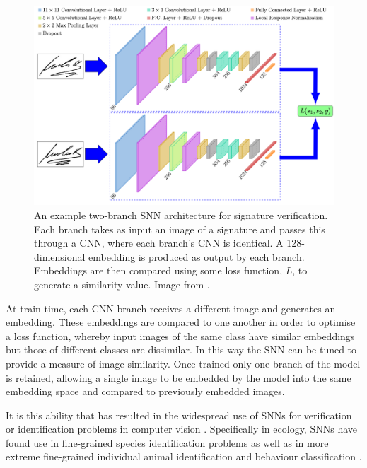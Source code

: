 \begin{figure}
	\begin{center}
		\includegraphics[width=0.8\linewidth]{Chapter6/figs/signet-SNN-architecture.png}
	\end{center}
	\caption[An example two-branch SNN architecture for signature verification.]{An example two-branch SNN architecture for signature verification. Each branch takes as input an image of a signature and passes this through a CNN, where each branch's CNN is identical. A 128-dimensional embedding is produced as output by each branch. Embeddings are then compared using some loss function, $L$, to generate a similarity value. Image from \cite{dey_signet_2017}.}
	\label{fig:signet-SNN-architecture}
\end{figure}

At train time, each CNN branch receives a different image and generates an embedding. These embeddings are compared to one another in order to optimise a loss function, whereby input images of the same class have similar embeddings but those of different classes are dissimilar. In this way the SNN can be tuned to provide a measure of image similarity. Once trained only one branch of the model is retained, allowing a single image to be embedded by the model into the same embedding space and compared to previously embedded images.

It is this ability that has resulted in the widespread use of SNNs for verification or identification problems in computer vision \cite{dey_signet_2017, wang_discriminative_2020}. Specifically in ecology, SNNs have found use in fine-grained species identification problems \cite{vetrova_hidden_2018, araujo_two-view_2022} as well as in more extreme fine-grained individual animal identification \cite{clapham_automated_2020} and behaviour classification \cite{brookes_triple-stream_2023}. 

